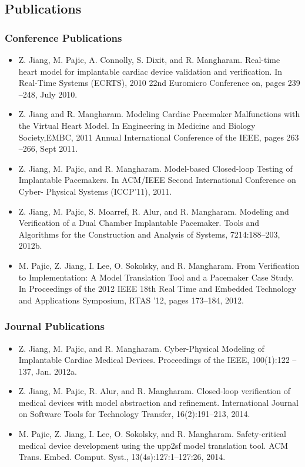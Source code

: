 \documentclass[a4paper]{article}
\begin{document}
\subsection{Publications}
\subsubsection{Conference Publications}
\begin{itemize}
\item Z. Jiang, M. Pajic, A. Connolly, S. Dixit, and R. Mangharam. Real-time heart model
for implantable cardiac device validation and verification. In Real-Time Systems
(ECRTS), 2010 22nd Euromicro Conference on, pages 239 –248, July 2010.
\item Z. Jiang and R. Mangharam. Modeling Cardiac Pacemaker Malfunctions with the
Virtual Heart Model. In Engineering in Medicine and Biology Society,EMBC,
2011 Annual International Conference of the IEEE, pages 263 –266, Sept 2011.
\item Z. Jiang, M. Pajic, and R. Mangharam. Model-based Closed-loop Testing of Implantable
Pacemakers. In ACM/IEEE Second International Conference on Cyber-
Physical Systems (ICCP’11), 2011.

\item Z. Jiang, M. Pajic, S. Moarref, R. Alur, and R. Mangharam. Modeling and Verification of a Dual Chamber Implantable Pacemaker. Tools and Algorithms for the
Construction and Analysis of Systems, 7214:188–203, 2012b.
\item M. Pajic, Z. Jiang, I. Lee, O. Sokolsky, and R. Mangharam. From Verification to
Implementation: A Model Translation Tool and a Pacemaker Case Study. In Proceedings
of the 2012 IEEE 18th Real Time and Embedded Technology and Applications
Symposium, RTAS ’12, pages 173–184, 2012.
\end{itemize}
\subsubsection{Journal Publications}
\begin{itemize}
\item Z. Jiang, M. Pajic, and R. Mangharam. Cyber-Physical Modeling of Implantable
Cardiac Medical Devices. Proceedings of the IEEE, 100(1):122 –137, Jan. 2012a.
\item Z. Jiang, M. Pajic, R. Alur, and R. Mangharam. Closed-loop verification of medical
devices with model abstraction and refinement. International Journal on Software
Tools for Technology Transfer, 16(2):191–213, 2014.
\item M. Pajic, Z. Jiang, I. Lee, O. Sokolsky, and R. Mangharam. Safety-critical medical
device development using the upp2sf model translation tool. ACM Trans. Embed.
Comput. Syst., 13(4s):127:1–127:26, 2014.
\end{itemize}
\end{document}
